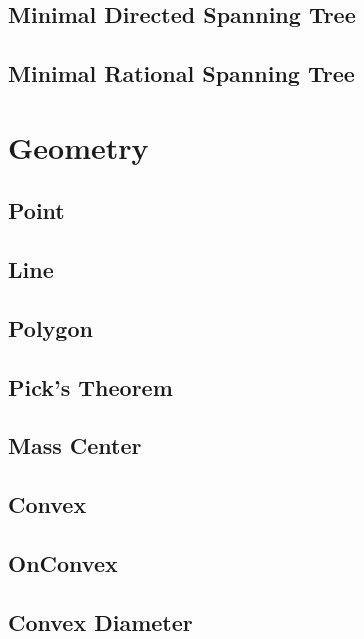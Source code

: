 \documentclass[10pt,twocolumn,oneside]{article}
\begin{document}
    \subsection{Minimal Directed Spanning Tree}
    
    \subsection{Minimal Rational Spanning Tree}
    
    \newpage
    \section{Geometry}
    \subsection{Point}
    
    \subsection{Line}
    
    \subsection{Polygon}
    
    \subsection{Pick's Theorem}
    
    \subsection{Mass Center}
    
    \subsection{Convex}
    
    \subsection{OnConvex}
    
    \subsection{Convex Diameter}
    
\end{document}
